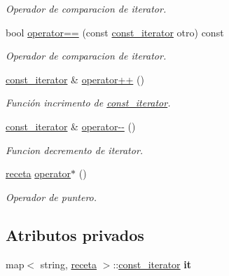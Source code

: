 \begin{DoxyCompactItemize}
\begin{DoxyCompactList}\small\item\em Operador de comparacion de iterator. \end{DoxyCompactList}\item 
bool \hyperlink{classrecetas_1_1const__iterator_a9aabf80e22620aa6508b9690f554c05f}{operator==} (const \hyperlink{classrecetas_1_1const__iterator}{const\+\_\+iterator} otro) const
\begin{DoxyCompactList}\small\item\em Operador de comparacion de iterator. \end{DoxyCompactList}\item 
\hyperlink{classrecetas_1_1const__iterator}{const\+\_\+iterator} \& \hyperlink{classrecetas_1_1const__iterator_aa9abcd68d74907b2483d2a7f8bb546af}{operator++} ()
\begin{DoxyCompactList}\small\item\em Función incrimento de \hyperlink{classrecetas_1_1const__iterator}{const\+\_\+iterator}. \end{DoxyCompactList}\item 
\hyperlink{classrecetas_1_1const__iterator}{const\+\_\+iterator} \& \hyperlink{classrecetas_1_1const__iterator_ad8735e8ae7237a13ccf62aa4cbf80c7b}{operator-\/-\/} ()
\begin{DoxyCompactList}\small\item\em Funcion decremento de iterator. \end{DoxyCompactList}\item 
\hyperlink{classreceta}{receta} \hyperlink{classrecetas_1_1const__iterator_a006a4603e352bd21e5458980536d9d8a}{operator$\ast$} ()
\begin{DoxyCompactList}\small\item\em Operador de puntero. \end{DoxyCompactList}\end{DoxyCompactItemize}
\subsection*{Atributos privados}
\begin{DoxyCompactItemize}
\item 
\mbox{\label{classrecetas_1_1const__iterator_a88cf8f4169e5e8867d917fde566dc468}} 
map$<$ string, \hyperlink{classreceta}{receta} $>$\+::\hyperlink{classrecetas_1_1const__iterator}{const\+\_\+iterator} {\bfseries it}
\end{DoxyCompactItemize}
